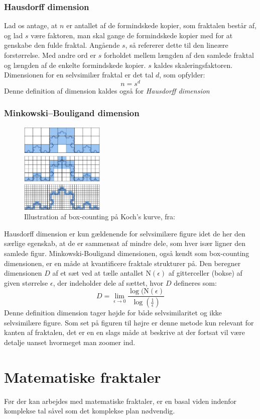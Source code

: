 \documentclass{article}
\begin{document}
\subsubsection{Hausdorff dimension}
Lad os antage, at $n$ er antallet af de formindskede kopier, som fraktalen består af, og lad $s$ være faktoren, man skal gange de formindskede kopier med for at genskabe den fulde fraktal.
Angående $s$, så refererer dette til den lineære forstørrelse. Med andre ord er $s$ forholdet mellem længden af den samlede fraktal og længden af de enkelte formindskede kopier. $s$ kaldes skaleringsfaktoren. Dimensionen for en selvsimilær fraktal er det tal $d$, som opfylder: $$n=s^d$$
Denne definition af dimension kaldes også for \textit{Hausdorff dimension} 
\subsubsection{Minkowski–Bouligand dimension}
\begin{figure}
\includegraphics[width=4cm]{boxcount.png}
\caption{Illustration af box-counting på Koch's kurve, fra: \parencite{inbook}}\label{wrap-fig:300}
\end{figure} 
Hausdorff dimension er kun gældenende for selvsimilære figure idet de her den særlige egenskab, at de er sammensat af mindre dele, som hver især ligner den samlede figur. Minkowski-Bouligand dimensionen, også kendt som box-counting dimensionen, er en måde at kvantificere fraktale strukturer på. Den beregner dimensionen $D$ af et sæt ved at tælle antallet $\text{N}(\epsilon)$ af gitterceller (bokse) af given størrelse $\epsilon$, der indeholder dele af sættet, hvor $D$ defineres som: $$D = \lim_{\epsilon\to0} \frac{\log(\text{N}(\epsilon)}{\log(\frac{1}{\epsilon})}$$
Denne definition dimension tager højde for både selvsimilaritet og ikke selvsimilære figure. Som set på figuren til højre er denne metode kun relevant for kanten af fraktalen, det er en en slags måde at beskrive at der fortsat vil være detalje uanset hvormeget man zoomer ind. \parencite{vestergaard}

\newpage
\section{Matematiske fraktaler}
Før der kan arbejdes med matematiske fraktaler, er en basal viden indenfor komplekse tal såvel som det komplekse plan nødvendig.
\end{document}
